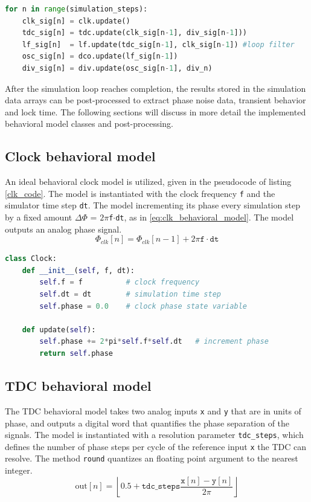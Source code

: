 \begin{lstlisting}[language={Python}, caption={PLL simulation loop Python pseudocode}, label={sim_code}]
for n in range(simulation_steps):
    clk_sig[n] = clk.update()
    tdc_sig[n] = tdc.update(clk_sig[n-1], div_sig[n-1]))
    lf_sig[n]  = lf.update(tdc_sig[n-1], clk_sig[n-1]) #loop filter
    osc_sig[n] = dco.update(lf_sig[n-1])
    div_sig[n] = div.update(osc_sig[n-1], div_n)
    \end{lstlisting}
After the simulation loop reaches completion, the results stored in the simulation data arrays can be post-processed to extract phase noise data, transient behavior and lock time. The following sections will discuss in more detail the implemented behavioral model classes and post-processing.

\subsection{Clock behavioral model}
An ideal behavioral clock model is utilized, given in the pseudocode of listing \ref{clk_code}. The model is instantiated with the clock frequency \texttt{f} and the simulator time step \texttt{dt}. The model incrementing its phase every simulation step by a fixed amount $\Delta \Phi$ = $2\pi$\texttt{f}$\cdot$\texttt{dt}, as in \ref{eq:clk_behavioral_model}. The model outputs an analog phase signal.
\begin{equation}\label{eq:clk_behavioral_model}
	\Phi_{clk}[n] = \Phi_{clk}[n-1] + 2\pi\mathtt{f}\cdot\mathtt{dt}
\end{equation}

\begin{lstlisting}[language={Python}, caption={Ideal clock behavioral model.}, label={clk_code}]
class Clock:
	def __init__(self, f, dt):
		self.f = f 			# clock frequency
		self.dt = dt 		# simulation time step
		self.phase = 0.0	# clock phase state variable

	def update(self):
		self.phase += 2*pi*self.f*self.dt 	# increment phase
		return self.phase
    \end{lstlisting}

\subsection{TDC behavioral model}
The TDC behavioral model takes two analog inputs \texttt{x} and \texttt{y} that are in units of phase, and outputs a digital word that quantifies the phase separation of the signals. The model is instantiated with a resolution parameter \texttt{tdc\_steps}, which defines the number of phase steps per cycle of the reference input \texttt{x} the TDC can resolve. The method \texttt{round} quantizes an floating point argument to the nearest integer.
\begin{equation}
	\text{out}[n] = \left\lfloor0.5 + \mathtt{tdc\_steps}\frac{\mathtt{x}[n]-\mathtt{y}[n]}{2\pi} \right\rfloor
\end{equation}

